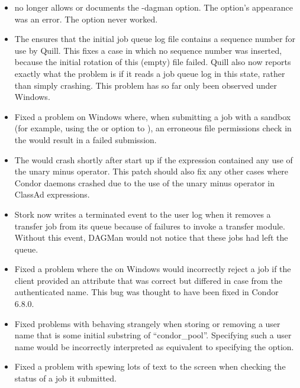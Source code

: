 \begin{itemize}
\item {} no longer allows or documents the -dagman option.
The option's appearance was an error.  The option never worked.

\item The  ensures that the initial job queue log file
contains a sequence number for use by Quill.  This fixes a case in
which no sequence number was inserted, because the initial rotation of
this (empty) file failed.  Quill also now reports exactly what the
problem is if it reads a job queue log in this state, rather than
simply crashing.  This problem has so far only been observed under
Windows.

\item Fixed a problem on Windows where, when submitting a job with a
sandbox (for example, using the  or  option to
), an erroneous file permissions check in the
 would result in a failed submission.

\item The  would crash shortly after start up if the
 expression contained any use of the unary minus
operator.  This patch should also fix any other cases where Condor
daemons crashed due to the use of the unary minus operator in ClassAd
expressions.

\item Stork now writes a terminated event to the user log when it removes
a transfer job from its queue because of failures to invoke a transfer
module. Without this event, DAGMan would not notice that these jobs had
left the queue.

\item Fixed a problem where the  on Windows would
incorrectly reject a job if the client provided an 
attribute that was correct but differed in case from the authenticated
name. This bug was thought to have been fixed in Condor 6.8.0.

\item Fixed problems with  behaving strangely when
storing or removing a user name that is some initial substring of
``condor\_pool''. Specifying such a user name would be incorrectly
interpreted as equivalent to specifying the  option.

\item Fixed a problem with  spewing lots of text to
the screen when checking the status of a job it submitted.


\end{itemize}
